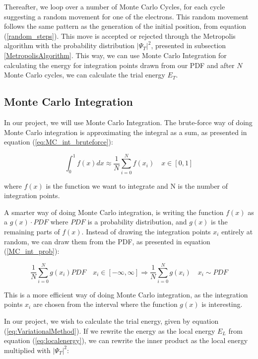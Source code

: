 \documentclass[norsk,a4paper,12pt]{article}
\begin{document}
Thereafter, we loop over a number of Monte Carlo Cycles, for each cycle suggesting a random movement for one of the electrons. This random movement follows the same pattern as the generation of the initial position, from equation (\ref{random_steps}). This move is accepted or rejected through the Metropolis algorithm with the probability distribution $|\Psi_T|^2$, presented in subsection \ref{MetropolisAlgorithm}. This way, we can use Monte Carlo Integration for calculating the energy for integration points drawn from our PDF and after $N$ Monte Carlo cycles, we can calculate the trial energy $E_T$.

\subsection{Monte Carlo Integration}
In our project, we will use Monte Carlo Integration. The brute-force way of doing Monte Carlo integration is approximating the integral as a sum, as presented in equation (\ref{eq:MC_int_bruteforce}):

\begin{equation}
    \int_0^1 f(x) dx \approx  \frac{1}{N}\sum_{i=0}^N f(x_i) \quad x \in [0,1]
    \label{eq:MC_int_bruteforce}
\end{equation}

where $f(x)$ is the function we want to integrate and N is the number of integration points. 

A smarter way of doing Monte Carlo integration, is writing the function $f(x)$ as a $g(x)\cdot PDF$ where $PDF$ is a probability distribution, and $g(x)$ is the remaining parts of $f(x)$. Instead of drawing the integration points $x_i$ entirely at random, we can draw them from the PDF, as presented in equation (\ref{MC_int_prob}):

\begin{equation}
    \frac{1}{N}\sum_{i=0}^N g(x_i) PDF \quad x_i \in [-\infty, \infty] \Rightarrow \frac{1}{N} \sum_{i=0}^N g(x_i) \quad x_i \sim PDF
    \label{MC_int_prob}
\end{equation}

This is a more efficient way of doing Monte Carlo integration, as the integration points $x_i$ are chosen from the interval where the function $g(x)$ is interesting.\par 

In our project, we wish to calculate the trial energy, given by equation (\ref{eq:VariationalMethod}). If we rewrite the energy as the local energy $E_L$ from equation (\ref{eq:localenergy}), we can rewrite the inner product as the local energy multiplied with $|\Psi_T|^2$:
\end{document}
